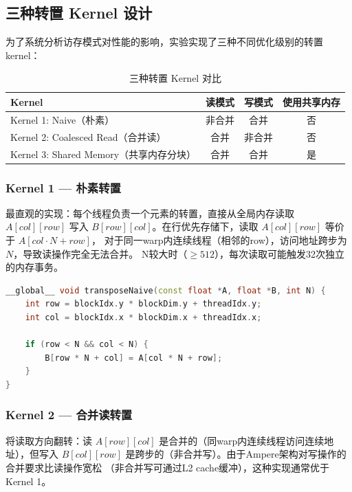 \documentclass[UTF8,a4paper,12pt,fontset=none]{ctexart}
\begin{document}
\subsection{三种转置 Kernel 设计}

为了系统分析访存模式对性能的影响，实验实现了三种不同优化级别的转置kernel：

\begin{table}[H]
  \centering
  \caption{三种转置 Kernel 对比}
  \label{tab:kernels}
  \begin{tabular}{lccc}
    \toprule
    Kernel & 读模式 & 写模式 & 使用共享内存 \\
    \midrule
    Kernel 1: Naive（朴素） & 非合并 & 合并 & 否 \\
    Kernel 2: Coalesced Read（合并读） & 合并 & 非合并 & 否 \\
    Kernel 3: Shared Memory（共享内存分块） & 合并 & 合并 & 是 \\
    \bottomrule
  \end{tabular}
\end{table}

\subsubsection{Kernel 1 — 朴素转置}

最直观的实现：每个线程负责一个元素的转置，直接从全局内存读取 $A[col][row]$ 写入
$B[row][col]$。在行优先存储下，读取 $A[col][row]$ 等价于 $A[col \cdot N + row]$，
对于同一warp内连续线程（相邻的row），访问地址跨步为 $N$，导致读操作完全无法合并。
N较大时（$\ge 512$），每次读取可能触发32次独立的内存事务。

\begin{lstlisting}[language=C++, caption={朴素转置 Kernel（读非合并）}]
__global__ void transposeNaive(const float *A, float *B, int N) {
    int row = blockIdx.y * blockDim.y + threadIdx.y;
    int col = blockIdx.x * blockDim.x + threadIdx.x;

    if (row < N && col < N) {
        B[row * N + col] = A[col * N + row];
    }
}
\end{lstlisting}

\subsubsection{Kernel 2 — 合并读转置}

将读取方向翻转：读 $A[row][col]$ 是合并的（同warp内连续线程访问连续地址），但写入
$B[col][row]$ 是跨步的（非合并写）。由于Ampere架构对写操作的合并要求比读操作宽松
（非合并写可通过L2 cache缓冲），这种实现通常优于Kernel 1。
\end{document}
